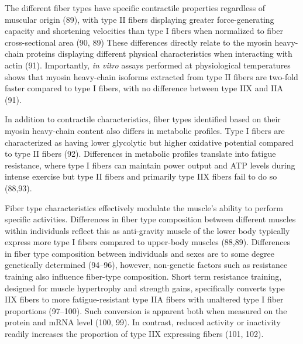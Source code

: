 \documentclass[twoside,10pt]{gihclass} %
\begin{document}
The different fiber types have specific contractile properties regardless of muscular origin
(89),
with type II fibers displaying greater force-generating capacity and shortening velocities than type I fibers when normalized to fiber cross-sectional area
(90, 89)
These differences directly relate to the myosin heavy-chain proteins displaying different physical characteristics when interacting with actin
(91).
Importantly, \emph{in vitro} assays performed at physiological temperatures shows that myosin heavy-chain isoforms extracted from type II fibers are two-fold faster compared to type I fibers, with no difference between type IIX and IIA
(91).

In addition to contractile characteristics, fiber types identified based on their myosin heavy-chain content also differs in metabolic profiles.
Type I fibers are characterized as having lower glycolytic but higher oxidative potential compared to type II fibers
(92).
Differences in metabolic profiles translate into fatigue resistance, where type I fibers can maintain power output and ATP levels during intense exercise but type II fibers and primarily type IIX fibers fail to do so
(88,93).

Fiber type characteristics effectively modulate the muscle's ability to perform specific activities. Differences in fiber type composition between different muscles within individuals reflect this as anti-gravity muscle of the lower body typically express more type I fibers compared to upper-body muscles
(88,89).
Differences in fiber type composition between individuals and sexes are to some degree genetically determined
(94--96),
however, non-genetic factors such as resistance training also influence fiber-type composition. Short term resistance training, designed for muscle hypertrophy and strength gains, specifically converts type IIX fibers to more fatigue-resistant type IIA fibers with unaltered type I fiber proportions
(97--100).
Such conversion is apparent both when measured on the protein and mRNA level
(100, 99).
In contrast, reduced activity or inactivity readily increases the proportion of type IIX expressing fibers
(101, 102).
\end{document}
